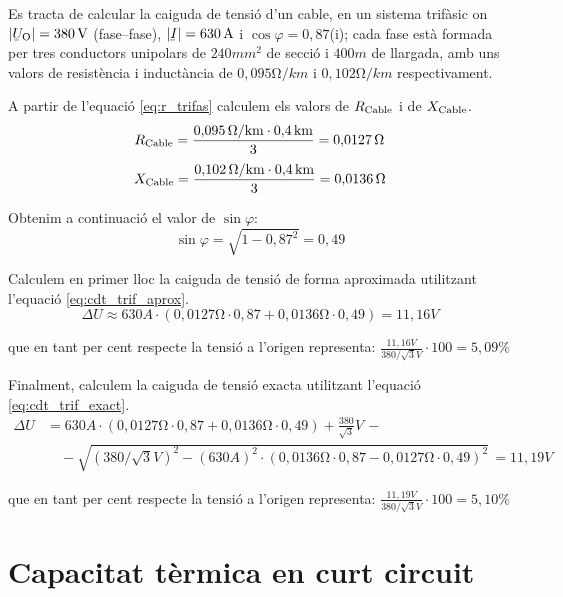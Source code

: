 \begin{exemple}
   Es tracta de calcular la caiguda de tensi\'{o} d'un cable, en un sistema trif\`{a}sic on $|\cmplx{U}\ped{O}| = 380\unit{V}$ (fase--fase), $|\cmplx{I}|=630\unit{A}$ i $\cos \varphi = 0{,}87$(i); cada fase est\`{a} formada per tres conductors unipolars de $240\unit{mm^2}$ de secci\'{o} i $400\unit{m}$ de llargada, amb uns valors de resist\`{e}ncia i induct\`{a}ncia de $0{,}095\unit{\ohm/km}$ i $0{,}102\unit{\ohm/km}$ respectivament.

A partir de l'equaci\'{o} \eqref{eq:r_trifas} calculem els valors de $R_\mathrm{Cable}$ i de $X_\mathrm{Cable}$.
\[
   R_\mathrm{Cable} = \frac{0{,}095\mathrm{\,\mathrm{\Omega}/km}\cdot 0{,}4\mathrm{\,km}}{3} = 0{,}0127\mathrm{\,\mathrm{\Omega}}
\]
\[
   X_\mathrm{Cable} = \frac{0{,}102\mathrm{\,\mathrm{\Omega}/km}\cdot 0{,}4\mathrm{\,km}}{3} = 0{,}0136\mathrm{\,\mathrm{\Omega}}
\]

Obtenim a continuaci\'{o} el valor de $\sin \varphi$:
\[
   \sin \varphi = \sqrt{1-0{,}87^2} = 0,49
\]

Calculem en primer lloc la caiguda de tensi\'{o} de forma aproximada utilitzant l'equaci\'{o} \eqref{eq:cdt_trif_aprox}.
\[
   \Delta U \approx 630\unit{A} \cdot ( 0{,}0127\unit{\ohm} \cdot 0{,}87 + 0{,}0136\unit{\ohm} \cdot 0{,}49 ) = 11{,}16\unit{V}
\]

que en tant per cent respecte la tensi\'{o} a l'origen representa:
$\frac{11{,}16\unit{V}}{380/\sqrt{3}\unit{V}} \cdot 100 = 5{,}09\unit{\%} $

Finalment, calculem la caiguda de tensi\'{o} exacta utilitzant l'equaci\'{o} \eqref{eq:cdt_trif_exact}.
\[ \begin{split}
   \Delta U &=  630\unit{A} \cdot ( 0{,}0127\unit{\ohm} \cdot 0{,}87 + 0{,}0136\unit{\ohm} \cdot 0{,}49 ) + \frac{380}{\sqrt{3}}\unit{V} \,- \\
    & \quad - \sqrt{(380/\sqrt{3}\unit{V})^2 - (630\unit{A})^2 \cdot ( 0{,}0136\unit{\ohm} \cdot 0{,}87 - 0{,}0127\unit{\ohm} \cdot 0{,}49 )^2 } \,= 11{,}19\unit{V}
\end{split} \]

que en tant per cent respecte la tensi\'{o} a l'origen representa:
$\frac{11{,}19\unit{V}}{380/\sqrt{3}\unit{V}} \cdot 100 = 5{,}10\unit{\%} $
\end{exemple}

\section{Capacitat t\`{e}rmica en curt circuit}

